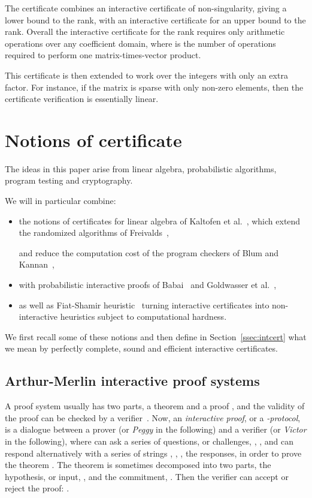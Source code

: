 \documentclass{article}
\begin{document}
The certificate combines an interactive certificate of non-singularity,
giving a lower bound to the rank, with an interactive certificate for an upper
bound to the rank.
Overall the interactive certificate for the rank requires only
 arithmetic operations over any coefficient domain,
where  is the number of operations required to perform one
matrix-times-vector product. 
 
This certificate is then extended to work over the integers with only an extra  factor.
For instance, if the matrix is sparse with only 
non-zero elements, then the certificate verification is essentially linear.

\section{Notions of certificate}\label{sec:notions}
The ideas in this paper arise from linear algebra, probabilistic algorithms,
program testing and cryptography. 

We will in particular combine:
\begin{itemize}
\item the notions of
certificates for linear algebra of Kaltofen et al.~\cite{Kaltofen:2011:quadcert},
which extend the randomized algorithms of Freivalds~\cite{Freivalds:1979:certif},
 
and reduce the computation cost of the program checkers of
Blum and Kannan~\cite{Blum:1995:checkwork},

\item with probabilistic interactive proofs of
Babai~\cite{Babai:1985:arthurmerlin} and Goldwasser et
al.~\cite{Goldwasser:1985:IPclass},
\item  as well as Fiat-Shamir
heuristic~\cite{Fiat:1986:Shamir,Bellare:1993:randomoracle} turning interactive
certificates into non-interactive heuristics subject to computational hardness.
\end{itemize}

We first recall some of these notions and then define
in Section~\ref{ssec:intcert} what we mean by perfectly complete, sound and
efficient interactive certificates.

\subsection{Arthur-Merlin interactive proof systems}
 
A proof system usually has two parts, a theorem  and a proof , and the
validity of the proof can be checked by a verifier~.
Now, an {\em interactive proof}, or a
{\em -protocol}, is a dialogue between a prover  (or {\em Peggy} in
the following) and a verifier  (or {\em Victor} in the following), where 
can ask a series of questions, or challenges, , ,  and  can
respond alternatively with a series of strings , , , the
responses,  in order to prove the theorem . 
The theorem is sometimes decomposed into two parts, the hypothesis, or input,
, and the commitment, . Then the verifier can accept or reject the
proof: 
. 
\end{document}
